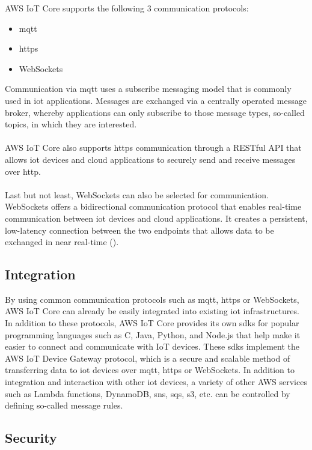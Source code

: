 AWS IoT Core supports the following 3 communication protocols:

\begin{itemize}
    \item \ac{mqtt}
    \item \ac{https}
    \item WebSockets
\end{itemize}
Communication via \ac{mqtt} uses a subscribe messaging model that is commonly used in \ac{iot} applications. 
Messages are exchanged via a centrally operated message broker, whereby applications can only subscribe to those message types, so-called topics, in which they are interested.
\\
\\
AWS IoT Core also supports \ac{https} communication through a RESTful API that allows \ac{iot} devices and cloud applications to securely send and receive messages over \ac{http}.
\\
\\
Last but not least, WebSockets can also be selected for communication. WebSockets offers a bidirectional communication protocol that enables real-time communication between \ac{iot} devices and cloud applications. 
It creates a persistent, low-latency connection between the two endpoints that allows data to be exchanged in near real-time ({\cite{ref02}}).

\subsection{Integration}

By using common communication protocols such as \ac{mqtt}, \ac{https} or WebSockets, AWS IoT Core can already be easily integrated into existing \ac{iot} infrastructures. 
In addition to these protocols, AWS IoT Core provides its own \ac{sdk}s for popular programming languages such as C, Java, Python, and Node.js that help make it easier to connect and communicate with IoT devices. 
These \ac{sdk}s implement the AWS IoT Device Gateway protocol, which is a secure and scalable method of transferring data to \ac{iot} devices over \ac{mqtt}, \ac{https} or WebSockets.
In addition to integration and interaction with other \ac{iot} devices, a variety of other AWS services such as Lambda functions, DynamoDB, \ac{sns}, \ac{sqs}, \ac{s3}, etc. can be controlled by defining so-called message rules.

\subsection{Security}